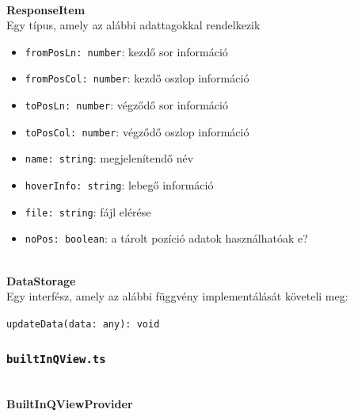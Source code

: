 \\
\vspace{14pt}
\textbf{ResponseItem}
\\

Egy típus, amely az alábbi adattagokkal rendelkezik

\begin{itemize}
    \item \lstinline{fromPosLn: number}: kezdő sor információ
    
    \item \lstinline{fromPosCol: number}: kezdő oszlop információ
    
    \item \lstinline{toPosLn: number}: végződő sor információ
    
     \item \lstinline{toPosCol: number}: végződő oszlop információ
    
    \item \lstinline{name: string}: megjelenítendő név
    
    \item \lstinline{hoverInfo: string}: lebegő információ
    
     \item \lstinline{file: string}: fájl elérése
    
    \item \lstinline{noPos: boolean}: a tárolt pozíció adatok használhatóak e?

\end{itemize}







\\
\vspace{14pt}
\textbf{DataStorage}
\\

\noindent Egy interfész, amely az alábbi függvény implementálását követeli meg:

\noindent\lstinline{updateData(data: any): void}




\subsubsection{\lstinline{builtInQView.ts}}


\\
\vspace{14pt}
\textbf{BuiltInQViewProvider}
\\

